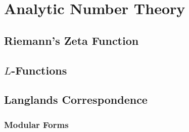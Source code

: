 \section{Analytic Number Theory}

\subsection{Riemann's Zeta Function}

\subsection{$L$-Functions}

\subsection{Langlands Correspondence}

\subsubsection{Modular Forms}




\begin{comment}

Revolutionary Math Proof No One Could Explain...Until Now
https://www.youtube.com/watch?v=RX1tZv_Nv4Y

\end{comment}